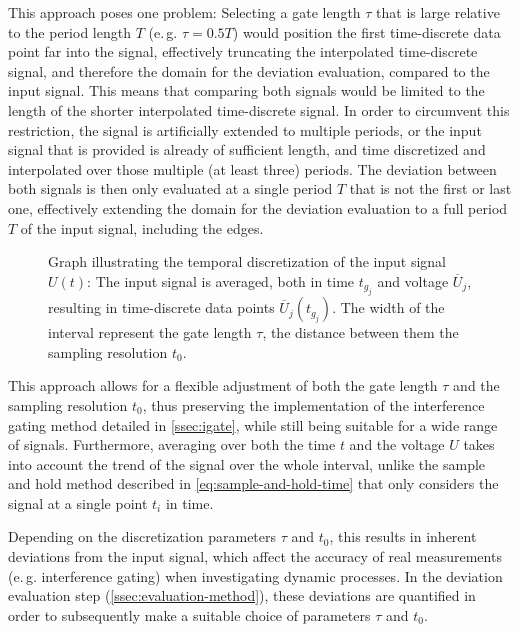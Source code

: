 This approach poses one problem: Selecting a gate length $\tau$ that is large relative to the period length $T$ (e.\,g. $\tau = 0.5T$) would position the first time-discrete data point far into the signal, effectively truncating the interpolated time-discrete signal, and therefore the domain for the deviation evaluation, compared to the input signal. This means that comparing both signals would be limited to the length of the shorter interpolated time-discrete signal. In order to circumvent this restriction, the signal is artificially extended to multiple periods, or the input signal that is provided is already of sufficient length, and time discretized and interpolated over those multiple (at least three) periods. The deviation between both signals is then only evaluated at a single period $T$ that is not the first or last one, effectively extending the domain for the deviation evaluation to a full period $T$ of the input signal, including the edges.%
\begin{figure}[H]
	\centering
	\caption{Graph illustrating the temporal discretization of the input signal $U\left(t\right)$: The input signal is averaged, both in time $t_{g_j}$ and voltage $\overline{U}_j$, resulting in time-discrete data points $\overline{U}_j\left(t_{g_j}\right)$. The width of the interval represent the gate length $\tau$, the distance between them the sampling resolution $t_0$.}
	\label{fig:discretization-method}
\end{figure}
This approach allows for a flexible adjustment of both the gate length $\tau$ and the sampling resolution $t_0$, thus preserving the implementation of the interference gating method detailed in \cref{ssec:igate}, while still being suitable for a wide range of signals. Furthermore, averaging over both the time $t$ and the voltage $U$ takes into account the trend of the signal over the whole interval, unlike the sample and hold method described in \cref{eq:sample-and-hold-time} that only considers the signal at a single point $t_i$ in time.

Depending on the discretization parameters $\tau$ and $t_0$, this results in inherent deviations from the input signal, which affect the accuracy of real measurements (e.\,g. interference gating) when investigating dynamic processes. In the deviation evaluation step (\cref{ssec:evaluation-method}), these deviations are quantified in order to subsequently make a suitable choice of parameters $\tau$ and $t_0$.
